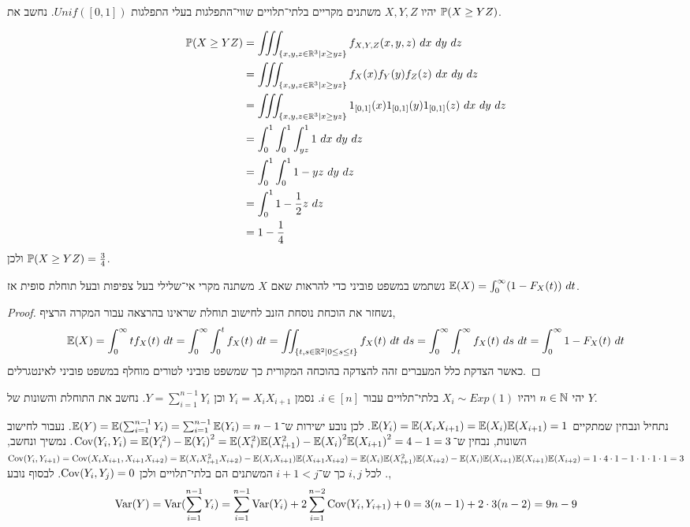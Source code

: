\question{}
יהיו $X, Y, Z$ משתנים מקריים בלתי־תלויים שווי־התפלגות בעלי התפלגות $Unif([0, 1])$.
נחשב את $\mathbb{P}(X \ge YZ)$.
\begin{solution}
	\begin{align*}
		\mathbb{P}(X \ge YZ)
		& = \iiint_{\{ x, y, z \in \mathbb{R}^3 \mid x \ge yz \}} f_{X, Y, Z}(x, y, z)\ dx\ dy\ dz \\
		& = \iiint_{\{ x, y, z \in \mathbb{R}^3 \mid x \ge yz \}} f_X(x) f_Y(y) f_Z(z)\ dx\ dy\ dz \\
		& = \iiint_{\{ x, y, z \in \mathbb{R}^3 \mid x \ge yz \}} 1_{[0, 1]}(x) 1_{[0, 1]}(y) 1_{[0, 1]}(z)\ dx\ dy\ dz \\
		& = \int_0^1 \int_0^1 \int_{yz}^1 1\ dx\ dy\ dz \\
		& = \int_0^1 \int_0^1 1 - yz\ dy\ dz \\
		& = \int_0^1 1 - \frac{1}{2} z\ dz \\
		& = 1 - \frac{1}{4}
	\end{align*}
	ולכן $\mathbb{P}(X \ge YZ) = \frac{3}{4}$.
\end{solution}

\question{}
נשתמש במשפט פוביני כדי להראות שאם $X$ משתנה מקרי אי־שלילי בעל צפיפות ובעל תוחלת סופית אז $\EE(X) = \int_0^\infty (1 - F_X(t))\ dt$.
\begin{proof}
	נשחזר את הוכחת נוסחת הזנב לחישוב תוחלת שראינו בהרצאה עבור המקרה הרציף,
	\[
		\mathbb{E}(X)
		= \int_0^{\infty} t f_X(t)\ dt
		= \int_0^{\infty} \int_{0}^{t} f_X(t)\ dt
		= \iint_{\{ t, s \in \mathbb{R}^2 \mid 0 \le s \le t \}} f_X(t)\ dt\ ds
		= \int_0^{\infty} \int_{t}^{\infty} f_X(t)\ ds\ dt
		= \int_0^{\infty} 1 - F_X(t)\ dt
	\]
	כאשר הצדקת כלל המעברים זהה להצדקה בהוכחה המקורית כך שמשפט פוביני לטורים מוחלף במשפט פוביני לאינטגרלים.
\end{proof}

\question{}
יהי $n \in \mathbb{N}$ ויהיו $X_i \sim Exp(1)$ בלתי־תלויים עבור $i \in [n]$.
נסמן $Y_i = X_i X_{i + 1}$ וכן $Y = \sum_{i = 1}^{n - 1} Y_i$.
נחשב את התוחלת והשונות של $Y$.
\begin{solution}
	נתחיל ונבחין שמתקיים $\mathbb{E}(Y_i) = \mathbb{E}(X_i X_{i + 1}) = \mathbb{E}(X_i) \mathbb{E}(X_{i + 1}) = 1$.
	לכן נובע ישירות ש־$\mathbb{E}(Y) = \mathbb{E}(\sum_{i = 1}^{n - 1} Y_i) = \sum_{i = 1}^{n - 1} \mathbb{E}(Y_i) = n - 1$.
	נעבור לחישוב השונות, נבחין ש־$\operatorname{Cov}(Y_i, Y_i) = \mathbb{E}(Y_i^2) - {\mathbb{E}(Y_i)}^2 = \mathbb{E}(X_i^2) \mathbb{E}(X_{i + 1}^2) - {\mathbb{E}(X_i)}^2 {\mathbb{E}(X_{i + 1})}^2 = 4 - 1 = 3$.
	נמשיך ונחשב, $\operatorname{Cov}(Y_i, Y_{i + 1}) = \operatorname{Cov}(X_i X_{i + 1}, X_{i + 1} X_{i + 2}) = \mathbb{E}(X_i X_{i + 1}^2 X_{i + 2}) - \mathbb{E}(X_i X_{i + 1}) \mathbb{E}(X_{i + 1} X_{i + 2}) = \mathbb{E}(X_i) \mathbb{E}(X_{i + 1}^2) \mathbb{E}(X_{i + 2}) - \mathbb{E}(X_i) \mathbb{E}(X_{i + 1}) \mathbb{E}(X_{i + 1}) \mathbb{E}(X_{i + 2}) = 1 \cdot 4 \cdot 1 - 1 \cdot 1 \cdot 1 \cdot 1 = 3$.
	לכל $i, j$ כך ש־$i + 1 < j$ המשתנים הם בלתי־תלויים ולכן $\operatorname{Cov}(Y_i, Y_j) = 0$.
	לבסוף נובע,
	\[
		\operatorname{Var}(Y)
		= \operatorname{Var}(\sum_{i = 1}^{n - 1} Y_i)
		= \sum_{i = 1}^{n - 1} \operatorname{Var}(Y_i) + 2 \sum_{i = 1}^{n - 2} \operatorname{Cov}(Y_i, Y_{i + 1}) + 0
		= 3(n - 1) + 2 \cdot 3(n - 2)
		= 9n - 9
	\]
\end{solution}

